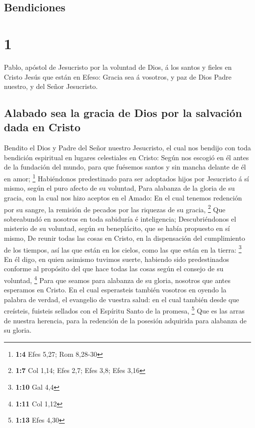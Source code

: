 \hypertarget{bendiciones}{%
\subsection{Bendiciones}\label{bendiciones}}

\hypertarget{section}{%
\section{1}\label{section}}

 Pablo, apóstol de Jesucristo por la voluntad de Dios, á los
santos y fieles en Cristo Jesús que están en Efeso:  Gracia
sea á vosotros, y paz de Dios Padre nuestro, y del Señor Jesucristo.

\hypertarget{alabado-sea-la-gracia-de-dios-por-la-salvaciuxf3n-dada-en-cristo}{%
\subsection{Alabado sea la gracia de Dios por la salvación dada en
Cristo}\label{alabado-sea-la-gracia-de-dios-por-la-salvaciuxf3n-dada-en-cristo}}

 Bendito el Dios y Padre del Señor nuestro Jesucristo, el
cual nos bendijo con toda bendición espiritual en lugares celestiales en
Cristo:  Según nos escogió en él antes de la fundación del
mundo, para que fuésemos santos y sin mancha delante de él en amor;
\footnote{\textbf{1:4} Efes 5,27; Rom 8,28-30}  Habiéndonos
predestinado para ser adoptados hijos por Jesucristo á sí mismo, según
el puro afecto de su voluntad,  Para alabanza de la gloria
de su gracia, con la cual nos hizo aceptos en el Amado:  En
el cual tenemos redención por su sangre, la remisión de pecados por las
riquezas de su gracia, \footnote{\textbf{1:7} Col 1,14; Efes 2,7; Efes
  3,8; Efes 3,16}  Que sobreabundó en nosotros en toda
sabiduría é inteligencia;  Descubriéndonos el misterio de su
voluntad, según su beneplácito, que se había propuesto en sí mismo,
 De reunir todas las cosas en Cristo, en la dispensación
del cumplimiento de los tiempos, así las que están en los cielos, como
las que están en la tierra: \footnote{\textbf{1:10} Gal 4,4}
 En él digo, en quien asimismo tuvimos suerte, habiendo
sido predestinados conforme al propósito del que hace todas las cosas
según el consejo de su voluntad, \footnote{\textbf{1:11} Col 1,12}
 Para que seamos para alabanza de su gloria, nosotros que
antes esperamos en Cristo.  En el cual esperasteis también
vosotros en oyendo la palabra de verdad, el evangelio de vuestra salud:
en el cual también desde que creísteis, fuisteis sellados con el
Espíritu Santo de la promesa, \footnote{\textbf{1:13} Efes 4,30}
 Que es las arras de nuestra herencia, para la redención de
la posesión adquirida para alabanza de su gloria.

